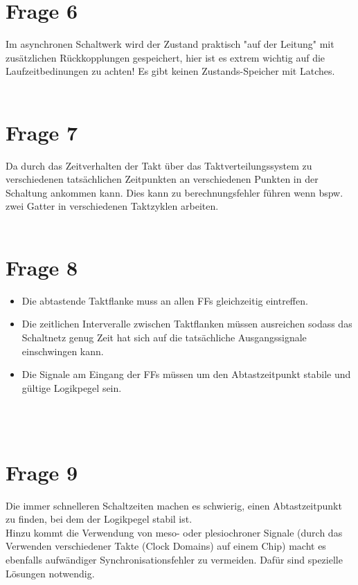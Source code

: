 \documentclass[a4paper]{scrartcl}
\newcounter{punkte}
\begin{document}
\section*{Frage 6}
Im asynchronen Schaltwerk wird der Zustand praktisch "auf der Leitung" mit zusätzlichen Rückkopplungen gespeichert, hier ist es extrem wichtig auf die Laufzeitbedinungen zu achten! Es gibt keinen Zustands-Speicher mit Latches.
~\\
~\\
\section*{Frage 7}
Da durch das Zeitverhalten der Takt über das Taktverteilungssystem zu verschiedenen tatsächlichen Zeitpunkten an verschiedenen Punkten in der Schaltung ankommen kann. Dies kann zu berechnungsfehler führen wenn bspw. zwei Gatter in verschiedenen Taktzyklen arbeiten.
~\\
~\\
\section*{Frage 8}
\begin{itemize}
	\item Die abtastende Taktflanke muss an allen FFs gleichzeitig eintreffen.
	\item Die zeitlichen Interveralle zwischen Taktflanken müssen ausreichen sodass das Schaltnetz genug Zeit hat sich auf die tatsächliche Ausgangssignale einschwingen kann.
	\item Die Signale am Eingang der FFs müssen um den Abtastzeitpunkt stabile und gültige Logikpegel sein.
\end{itemize}
~\\
~\\
\section*{Frage 9}
Die immer schnelleren Schaltzeiten machen es schwierig, einen Abtastzeitpunkt zu finden, bei dem der Logikpegel stabil ist.\\
Hinzu kommt die Verwendung von meso- oder plesiochroner Signale (durch das Verwenden verschiedener Takte (Clock Domains) auf einem Chip) macht es ebenfalls aufwändiger Synchronisationsfehler zu vermeiden. Dafür sind spezielle Lösungen notwendig.\\

~\\
~\\
\end{document}
